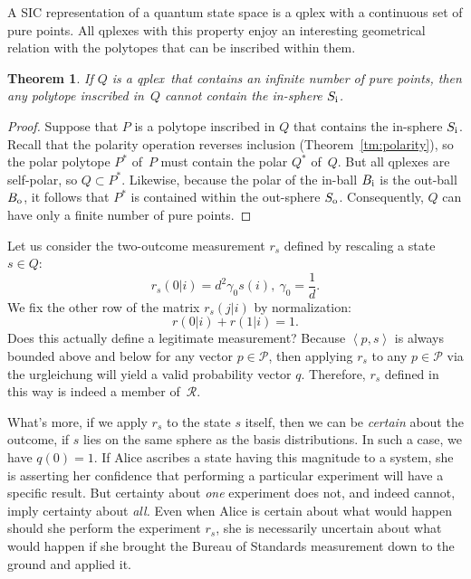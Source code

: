 \documentclass[aps,pra,superscriptaddress,10pt,tightenlines,twocolumn,nofootinbib]{revtex4}
\newtheorem{theorem}{Theorem}
\theoremstyle{remark}
\newcommand{\dl}[1]{#1^{*}}
\newcommand{\bo}{B_{\rm{o}}}
\newcommand{\bi}{B_{\rm{i}}}
\newcommand{\so}{S_{\rm{o}}}
\newcommand{\si}{S_{\rm{i}}}
\newcommand{\qp}{Q}
\newcommand{\qplex}{qplex}
\newcommand{\cP}{\mathcal{P}}
\newcommand{\cR}{\mathcal{R}}
\newcommand{\inprod}[2]{{\left\langle #1 , #2 \right\rangle}}
\begin{document}
A SIC representation of a quantum state space is a qplex with a
continuous set of pure points.  All qplexes with this property enjoy
an interesting geometrical relation with the polytopes that can be
inscribed within them.

\begin{theorem}
If $\qp$ is a \qplex\ that contains an infinite number
  of pure points, then any polytope inscribed in~$\qp$ cannot contain
  the in-sphere $\si$.
\end{theorem}
\begin{proof}
Suppose that $P$ is a polytope inscribed in $\qp$ that contains the
in-sphere $\si$.  Recall that the polarity operation reverses
inclusion (Theorem~\ref{tm:polarity}), so the polar polytope $\dl{P}$
of~$P$ must contain the polar $\dl{\qp}$ of~$\qp$.  But all qplexes are
self-polar, so $\qp \subset \dl{P}$.  Likewise, because the polar of the
in-ball $\bi$ is the out-ball $\bo$, it follows that $\dl{P}$ is
contained within the out-sphere $\so$.  Consequently, $\qp$ can have
only a finite number of pure points.
\end{proof}

Let us consider the two-outcome measurement $r_{{s}}$ defined by
rescaling a state ${s} \in \qp$:
\begin{equation}
r_{{s}}(0|i) = d^2 \gamma_0 s(i),\ \gamma_0 = \frac{1}{d}.
\end{equation}
We fix the other row of the matrix $r_{{s}}(j|i)$ by
normalization:
\begin{equation}
r(0|i) + r(1|i) = 1.
\end{equation}
Does this actually define a legitimate measurement?  Because
$\inprod{p}{s}$ is always bounded above and below for any vector ${p}
\in \cP$, then applying $r_{{s}}$ to any ${p} \in \cP$ via the
urgleichung will yield a valid probability vector ${q}$.  Therefore,
$r_{{s}}$ defined in this way is indeed a member of~$\cR$.

What's more, if we apply $r_{{s}}$ to the state ${s}$ itself,
then we can be \emph{certain} about the outcome, if ${s}$ lies on
the same sphere as the basis distributions.  In such a case, we have
$q(0) = 1$.  If Alice ascribes a state having this magnitude to a
system, she is asserting her confidence that performing a particular
experiment will have a specific result.  But certainty about
\emph{one} experiment does not, and indeed cannot, imply certainty
about \emph{all.}  Even when Alice is certain about what would happen
should she perform the experiment $r_{{s}}$, she is necessarily
uncertain about what would happen if she brought the Bureau of
Standards measurement down to the ground and applied it.
\end{document}
